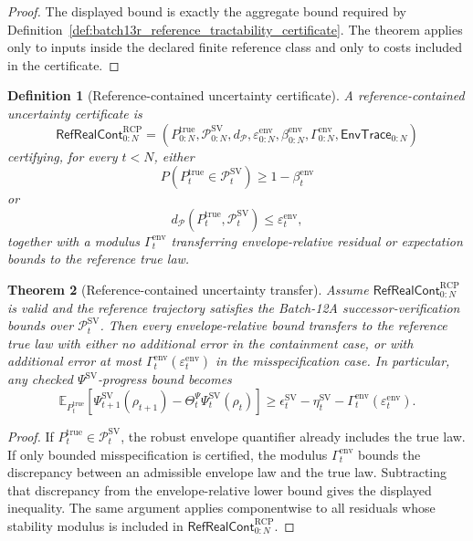 \documentclass[11pt]{article}
\newtheorem{theorem}{Theorem}[section]
\newtheorem{definition}[theorem]{Definition}
\newcommand{\Pcal}{\mathcal{P}}
\newcommand{\1}{\mathbf{1}}
\newcommand{\RCP}{\mathrm{RCP}}
\providecommand{\true}{\mathrm{true}}
\begin{document}
\begin{proof}
The displayed bound is exactly the aggregate bound required by Definition~\ref{def:batch13r_reference_tractability_certificate}.  The theorem applies only to inputs inside the declared finite reference class and only to costs included in the certificate.
\end{proof}

\begin{definition}[Reference-contained uncertainty certificate]
\label{def:batch13r_reference_contained_uncertainty_certificate}
A reference-contained uncertainty certificate is
\[
\mathsf{RefRealCont}_{0:N}^{\RCP}
=(P_{0:N}^{\true},\Pcal_{0:N}^{\mathrm{SV}},d_{\Pcal},\varepsilon_{0:N}^{\mathrm{env}},\beta_{0:N}^{\mathrm{env}},\Gamma_{0:N}^{\mathrm{env}},\mathsf{EnvTrace}_{0:N})
\]
certifying, for every \(t<N\), either
\[
P(P_t^{\true}\in\Pcal_t^{\mathrm{SV}})\ge1-\beta_t^{\mathrm{env}}
\]
or
\[
d_{\Pcal}(P_t^{\true},\Pcal_t^{\mathrm{SV}})\le\varepsilon_t^{\mathrm{env}},
\]
together with a modulus \(\Gamma_t^{\mathrm{env}}\) transferring envelope-relative residual or expectation bounds to the reference true law.
\end{definition}

\begin{theorem}[Reference-contained uncertainty transfer]
\label{thm:batch13r_reference_contained_uncertainty_transfer}
Assume \(\mathsf{RefRealCont}_{0:N}^{\RCP}\) is valid and the reference trajectory satisfies the Batch-12A successor-verification bounds over \(\Pcal_t^{\mathrm{SV}}\).  Then every envelope-relative bound transfers to the reference true law with either no additional error in the containment case, or with additional error at most \(\Gamma_t^{\mathrm{env}}(\varepsilon_t^{\mathrm{env}})\) in the misspecification case.  In particular, any checked \(\Psi^{\mathrm{SV}}\)-progress bound becomes
\[
\mathbb E_{P_t^{\true}}
\left[
\Psi_{t+1}^{\mathrm{SV}}(\rho_{t+1})-
\Theta_t^{\Psi}\Psi_t^{\mathrm{SV}}(\rho_t)
\right]
\ge
\epsilon_t^{\mathrm{SV}}-
\eta_t^{\mathrm{SV}}-
\Gamma_t^{\mathrm{env}}(\varepsilon_t^{\mathrm{env}}).
\]
\end{theorem}

\begin{proof}
If \(P_t^{\true}\in\Pcal_t^{\mathrm{SV}}\), the robust envelope quantifier already includes the true law.  If only bounded misspecification is certified, the modulus \(\Gamma_t^{\mathrm{env}}\) bounds the discrepancy between an admissible envelope law and the true law.  Subtracting that discrepancy from the envelope-relative lower bound gives the displayed inequality.  The same argument applies componentwise to all residuals whose stability modulus is included in \(\mathsf{RefRealCont}_{0:N}^{\RCP}\).
\end{proof}
\end{document}
